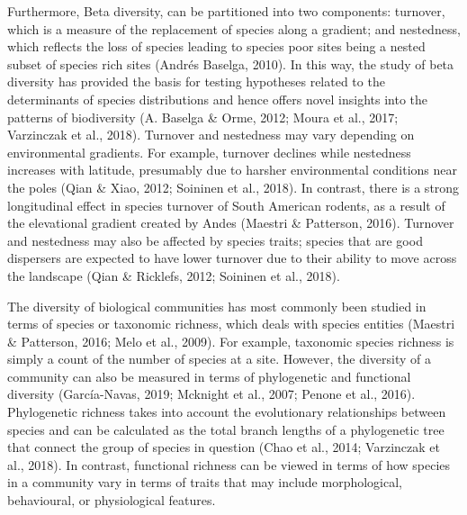 \documentclass{article}
\begin{document}
\vspace{5mm}

Furthermore, Beta diversity, can be partitioned into two components: turnover, which is a measure of the replacement of species along a gradient; and nestedness, which reflects the loss of species leading to species poor sites being a nested subset of species rich sites (Andrés Baselga, 2010). %
In this way, the study of beta diversity has provided the basis for testing hypotheses related to the determinants of species distributions and hence offers novel insights into the patterns of biodiversity (A. Baselga \& Orme, 2012; Moura et al., 2017; Varzinczak et al., 2018). %
Turnover and nestedness may vary depending on environmental gradients. For example, turnover declines while nestedness increases with latitude, presumably due to harsher environmental conditions near the poles (Qian \& Xiao, 2012; Soininen et al., 2018). In contrast, there is a strong longitudinal effect in species turnover of South American rodents, as a result of the elevational gradient created by Andes (Maestri \& Patterson, 2016). Turnover and nestedness may also be affected by species traits;  species that are good dispersers are expected to have lower turnover due to their ability to move across the landscape (Qian \& Ricklefs, 2012; Soininen et al., 2018). 

\vspace{5mm}

The diversity of biological communities has most commonly been studied in terms of species or taxonomic richness, which deals with species entities (Maestri \& Patterson, 2016; Melo et al., 2009). For example, taxonomic species richness is simply a count of the number of species at a site. However, the diversity of a community can also be measured in terms of phylogenetic and functional diversity (García-Navas, 2019; Mcknight et al., 2007; Penone et al., 2016). Phylogenetic richness takes into account the evolutionary relationships between species and can be calculated as the total branch lengths of a phylogenetic tree that connect the group of species in question (Chao et al., 2014; Varzinczak et al., 2018).
In contrast, functional richness can be viewed in terms of how species in a community vary in terms of traits that may include morphological, behavioural, or physiological features. 
\end{document}
